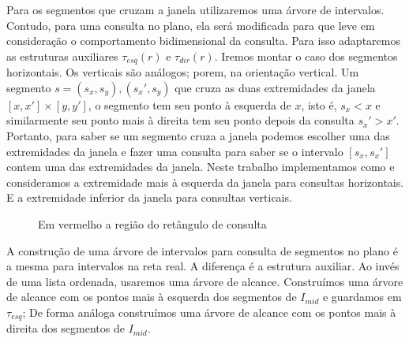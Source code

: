 Para os segmentos que cruzam a janela utilizaremos uma árvore de intervalos. Contudo, para uma consulta no plano, ela será modificada para que leve em consideração o comportamento bidimensional da consulta. Para isso adaptaremos as estruturas auxiliares $\tau_{esq}(r)$ e $\tau_{dir}(r)$.
Iremos montar o caso dos segmentos horizontais. Os verticais são análogos; porem, na orientação vertical. Um segmento $s= (s_x,s_y), (s_x',s_y)$ que cruza as duas extremidades da janela $[x, x'] \times [y, y']$, o segmento tem seu ponto à esquerda de $x$, isto é, $s_x < x$ e similarmente seu ponto mais à direita tem seu ponto depois da consulta $s_x' > x'$. Portanto, para saber se um segmento cruza a janela podemos escolher uma das extremidades da janela e fazer uma consulta para saber se o intervalo $[s_x, s_x']$ contem uma das extremidades da janela. Neste trabalho implementamos como \cite{cgi1} e consideramos a extremidade mais à esquerda da janela para consultas horizontais. E a extremidade inferior da janela para consultas verticais.
\begin{figure}[h]
\centering
{}
\caption {Em vermelho a região do retângulo de consulta}
\label{fig:23}
\end{figure}
A construção de uma árvore de intervalos para consulta de segmentos no plano é a mesma para intervalos na reta real. A diferença é a estrutura auxiliar. Ao invés de uma lista ordenada, usaremos uma árvore de alcance. Construímos uma árvore de alcance com os pontos mais à esquerda dos segmentos de $I_{mid}$ e guardamos em $\tau_{esq}$; De forma análoga construímos uma árvore de alcance com os pontos mais à direita dos segmentos de $I_{mid}$.


